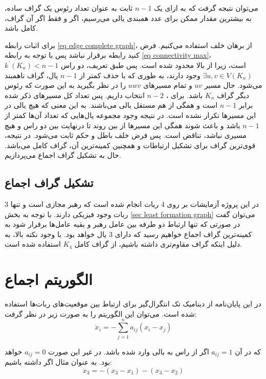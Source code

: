 می‌توان نتیجه گرفت که به ازای یک 
$n-1$ 
ثابت به عنوان تعداد رئوس یک گراف ساده، به بیشترین مقدار ممکن برای عدد همبندی یالی می‌رسیم، اگر و فقط اگر آن گراف، کامل باشد.

برای اثبات رابطه \ref{eq edge complete graph}، از برهان خلف استفاده می‌کنیم. فرض کنید رابطه برقرار نباشد پس با توجه به رابطه \ref{eq connectivity max}، 
$k^\prime(K_n) < n-1$
است، زیرا از بالا محدود شده است. پس طبق تعریف، دو راس 
$\exists u,v \in V(K_n)$ 
وجود دارند، به طوری که با حذف کمتر از 
$n-1$
یال، گراف ناهمبند می‌شود. حال مسیر 
$uv$ 
و تمام مسیرهای 
$uwv$ 
را در نظر بگیرید به این صورت که  رئوس دیگر گراف 
$K_n$
باشد. برای ، 
$n-2$ 
انتخاب داریم. پس تعداد کل مسیرهای ذکر شده برابر 
$n-1$ 
است و همگی از هم مستقل یالی می‌باشند. به این معنی که هیچ یالی در این مسیرها تکرار نشده است. در نتیجه وجود مجموعه‌ یال‌هایی که تعداد آن‌ها کمتر از 
$n-1$ 
باشد و باعث شوند همگی این مسیرها از بین روند تا درنهایت بین دو راس  و  هیچ مسیری نباشد، تناقض است. پس فرض خلف باطل و حکم ثابت می‌شود. در نتیجه، قوی‌ترین گراف برای تشکیل ارتباطات و همچنین کمینه‌ترین آن، گراف کامل می‌باشد. حال به تشکیل گراف اجماع می‌پردازیم.

\subsection{تشکیل گراف اجماع}
در این پروژه آزمایشات بر روی 4 ربات انجام شده است که رهبر مجازی است و تنها 3 ربات وجود فیزیکی دارند. با توجه به بخش \ref{sec least formation graph} می‌توان گفت در صورتی که تنها ارتباط دو طرفه بین عامل رهبر و بقیه عامل‌ها برقرار شود به کمینه‌ترین گراف اجماع خواهیم رسید که دارای 3 یال خواهد بود. با وجود نکته بالا، به دلیل اینکه گراف مقاوم‌تری داشته باشیم، از گراف کامل $K_4$ استفاده شده است. 


\section{الگوریتم اجماع}
در این پایان‌نامه از دینامیک تک انتگرال‌گیر برای ارتباط بین موقعیت‌های ربات‌ها استفاده شده است. می‌توان این الگوریتم‌ را به صورت زیر در نظر گرفت:
\begin{equation}\label{eq platoon sum}
\dot{x}_i = -\sum_{j=1}^{n} a_{ij}(x_i-x_j)
\end{equation}

که در آن $a_{ij} = 1$ اگر از راس  به  یالی وارد شده باشد. در غیر این صورت $a_{ij} = 0$ خواهد بود. به عنوان مثال اگر داشته باشیم:
\begin{equation}
\dot{x}_3 = -(x_3-x_1)-(x_3-x_2)
\end{equation}

